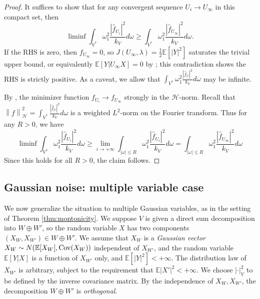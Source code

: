 \documentclass[a4paper]{article}
\newcommand{\Cov}{{\rm Cov}}
\theoremstyle{definition}
\newcommand{\norm}[1]{\left\lVert#1\right\rVert}
\newcommand{\E}{\mathbb{E}}
\newcommand{\1}{\mathbbm{1}}
\begin{document}
	
	\begin{proof}
		It suffices to show that for any convergent sequence $U_i\to U_\infty$ in this compact set, then 
		\[
		\liminf \int_{V^*} \omega_1^2  \frac{ |\hat{f}_{U_i}|^2}{k_V} d\omega  \geq  \int_{V^*}  \omega_1^2  \frac{ |\hat{f}_{U_\infty}|^2}{k_V} d\omega .
		\]
		If the RHS is zero, then $f_{U_\infty}=0$, so $J(U_\infty,\lambda)=\frac{1}{2}\E[|Y|^2]$ saturates the trivial upper bound, or equivalently $\E[Y|U_\infty X  ]=0$ by \cite[Lem. 2.3]{RuanLi}; this contradiction shows the RHS is strictly positive. As a caveat, we allow that $\int_{V^*} \omega_1^2  \frac{ |\hat{f}_U|^2}{k_V} d\omega $ may be infinite.
		
		
		
		By \cite[Corollary 2.9]{RuanLi}, the minimizer function $f_{U_i}\to f_{U_\infty}$ strongly in the $\mathcal{H}$-norm. Recall that $\norm{f}_{\mathcal{H}}^2= \int_{V^*}  \frac{ |\hat{f}_U|^2}{k_V} d\omega$ is a weighted $L^2$-norm on the Fourier transform. Thus for any $R>0$, we have
		\[
		\liminf \int_{ V^*}  \omega_1^2  \frac{ |\hat{f}_{U_i}|^2}{k_V} d\omega\geq 	\lim_{i\to +\infty}	\int_{ |\omega|\leq R}  \omega_1^2  \frac{ |\hat{f}_{U_i}|^2}{k_V} d\omega = \int_{ |\omega|\leq R}  \omega_1^2  \frac{ |\hat{f}_{U_\infty}|^2}{k_V} d\omega
		\]
		Since this holds for all $R>0$, the claim follows.
	\end{proof}
	
	
	
	
	
	
	
	
	\subsection{Gaussian noise: multiple variable case}\label{sect:Gaussianmultiple}
	
	
	
	
	
	We now generalize the situation to multiple Gaussian variables, as in the setting of Theorem \ref{thm:montonicity}. We suppose $V$ is given a direct sum decomposition into $W\oplus W'$, so the random variable $X$ has two components $(X_W, X_{W'})\in W\oplus W'$. We assume that $X_W$ is a \emph{Gaussian vector} $X_W\sim N(\E[X_W], \Cov(X_W)) $  independent of $X_{W'}$, and the random variable $\E[Y|X]$ is a function of $X_{W'}$ only, and $\E[|Y|^2]<+\infty$. The distribution law of $X_{W'}$ is arbitrary, subject to the requirement that $\E|X'|^2<+\infty$. We choose $|\cdot|_V^2$ to be defined by the inverse covariance matrix. By the independence of $X_W, X_{W'}$,  the decomposition $W\oplus W'$ is \emph{orthogonal}.
	
\end{document}

